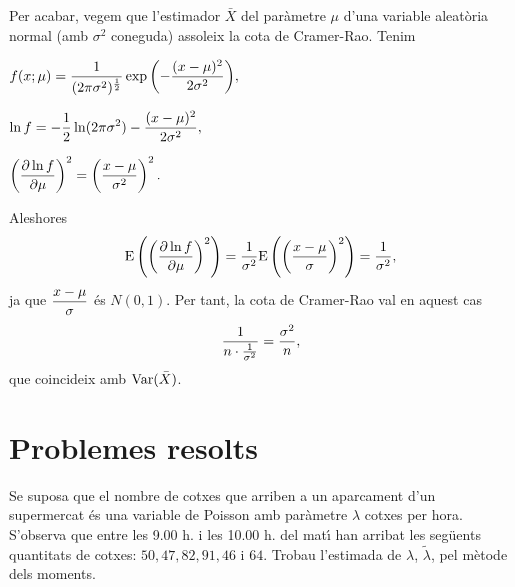 Per acabar, vegem que l'estimador $\bar{X}$ del par\`ametre $\mu$ d'una 
variable aleat\`oria normal (amb $\sigma^2$ coneguda) assoleix la cota de Cramer-Rao.
Tenim

\begin{description}
\item $\displaystyle f(x;\mu) = {1 \over (2 \pi \sigma^2)^{1 \over 2}} \exp{
\left( -{(x-\mu)^2 \over 2 \sigma^2}\right)},$

\item $\displaystyle \ln f = -{1 \over 2} \ln (2 \pi \sigma^2) - {(x-\mu)^2
\over 2 \sigma^2},$

\item $\displaystyle \left( {\partial \ln f \over \partial \mu} \right)^2 =
\left( {x-\mu \over \sigma^2} \right)^2.$
\end{description}


Aleshores
$${\rm E} \left(\left( {\partial \ln f \over \partial \mu} \right)^2\right) = {1 \over
\sigma^2} {\rm E} \left(\left( {x-\mu \over \sigma} \right)^2\right) = {1 \over \sigma^2},$$
ja que $\displaystyle {x-\mu \over \sigma}$ \'es $N(0,1)$. Per tant, la cota de
Cramer-Rao val en aquest cas
$${1 \over n \cdot {1 \over \sigma^2}} = {\sigma^2 \over n},$$
que coincideix amb ${\rm Var}(\bar{X})$.

\section{Problemes resolts}

\begin{probres}
{Se suposa que el nombre de cotxes que arriben a un aparcament d'un
supermercat \'es una variable de Poisson amb par\`ametre $\lambda$ 
cotxes per hora. S'observa
que entre les 9.00 h. i les 10.00 h. del mat\'{\i} han arribat les seg\"uents
quantitats de cotxes: $50,47,82,91,46$ i $64$. Trobau l'estimada de $\lambda$,
$\tilde\lambda$, pel m\`etode dels moments.}
\end{probres}


